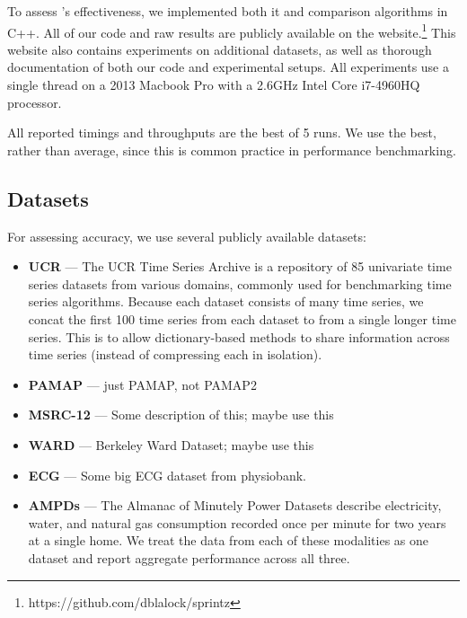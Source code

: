 
To assess \mine's effectiveness, we implemented both it and comparison algorithms in C++. All of our code and raw results are publicly available on the \minesp website.\footnote{https://github.com/dblalock/sprintz} This website also contains experiments on additional datasets, as well as thorough documentation of both our code and experimental setups. All experiments use a single thread on a 2013 Macbook Pro with a 2.6GHz Intel Core i7-4960HQ processor.

All reported timings and throughputs are the best of 5 runs. We use the best, rather than average, since this is common practice in performance benchmarking.

\subsection{Datasets}

For assessing accuracy, we use several publicly available datasets:
\begin{itemize}[leftmargin=4mm]
\item \textbf{UCR} \cite{ucrTimeSeries} --- The UCR Time Series Archive is a repository of 85 univariate time series datasets from various domains, commonly used for benchmarking time series algorithms. Because each dataset consists of many time series, we concat the first 100 time series from each dataset to from a single longer time series. This is to allow dictionary-based methods to share information across time series (instead of compressing each in isolation).
\item \textbf{PAMAP} \cite{pamap} --- just PAMAP, not PAMAP2
\item \textbf{MSRC-12} \cite{msrc} --- Some description of this; maybe use this
\item \textbf{WARD} \cite{ward} --- Berkeley Ward Dataset; maybe use this
\item \textbf{ECG} \cite{physiobank} --- Some big ECG dataset from physiobank.
\item \textbf{AMPDs} \cite{ampds} --- The Almanac of Minutely Power Datasets describe electricity, water, and natural gas consumption recorded once per minute for two years at a single home. We treat the data from each of these modalities as one dataset and report aggregate performance across all three.
\end{itemize}

